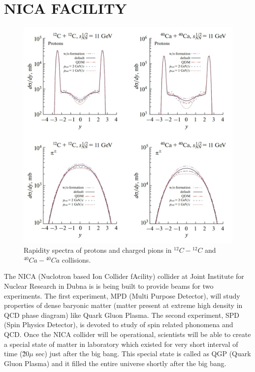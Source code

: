 \documentclass[12pt]{article}
\begin{document}
\section{NICA FACILITY}

\begin{figure}[h]
\centering
\includegraphics[scale=0.3]{ABRAMOV_Fig.36.jpg}
\caption{Rapidity spectra of protons and charged pions in $^{12}C-{^{12}C}$ and $^{40}Ca-{^{40}Ca}$ collisions.}
\label{ABRAMOV_Paper_Fig.36}
\end{figure}

The NICA (Nuclotron based Ion Collider fAcility) collider at Joint Institute for Nuclear Research in Dubna is is being built to  provide beams for two experiments. The first experiment, MPD (Multi Purpose Detector), will study properties of dense baryonic matter (matter present at extreme high density in QCD phase diagram) like Quark Gluon Plasma. The second experiment, SPD (Spin Physics Detector), is devoted to study of spin related phonomena and QCD. Once the NICA collider will be operational, scientists will be able to create a special state of matter in laboratory which existed for very short interval of time (\~20$\mu$ sec) just after the big bang. This special state is called as QGP (Quark Gluon Plasma) and it filled the entire universe shortly after the big bang.
\end{document}
